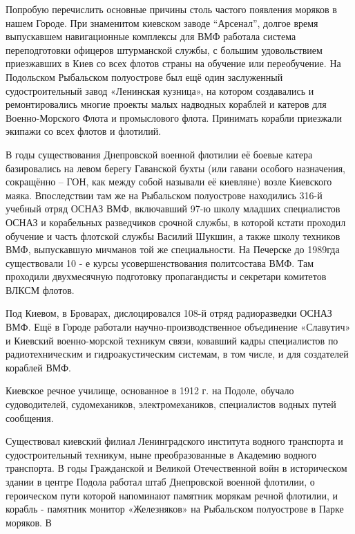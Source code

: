
Попробую перечислить основные причины столь частого появления
моряков в нашем Городе. При знаменитом киевском заводе \enquote{Арсенал}, долгое время
выпускавшем навигационные комплексы для ВМФ работала система переподготовки
офицеров штурманской службы, с большим удовольствием приезжавших в Киев со всех
флотов страны на обучение или переобучение. На Подольском Рыбальском
полуострове был ещё один заслуженный судостроительный завод «Ленинская
кузница», на котором создавались и ремонтировались многие проекты малых
надводных кораблей и катеров для Военно-Морского Флота и промыслового флота.
Принимать корабли приезжали экипажи со всех флотов и флотилий. 


В годы
существования Днепровской военной флотилии её боевые катера базировались на
левом берегу Гаванской бухты (или гавани особого назначения, сокращённо – ГОН,
как между собой называли её киевляне) возле Киевского маяка. Впоследствии там
же на Рыбальском полуострове находились 316-й учебный отряд ОСНАЗ ВМФ,
включавший 97-ю школу младших специалистов ОСНАЗ и корабельных разведчиков
срочной службы, в которой кстати проходил обучение и часть флотской службы
Василий Шукшин, а также школу техников ВМФ, выпускавшую мичманов той же
специальности. На Печерске до 1989гда существовали 10 - е курсы
усовершенствования политсостава ВМФ. Там проходили двухмесячную подготовку
пропагандисты и секретари комитетов ВЛКСМ флотов. 


Под Киевом, в Броварах,
дислоцировался 108-й отряд радиоразведки ОСНАЗ ВМФ. Ещё в Городе работали
научно-производственное объединение «Славутич» и Киевский военно-морской
техникум связи, ковавший кадры специалистов по радиотехническим и
гидроакустическим системам, в том числе, и для создателей кораблей ВМФ.


Киевское речное училище, основанное в 1912 г. на Подоле, обучало судоводителей,
судомехаников, электромехаников, специалистов водных путей сообщения.

Существовал киевский филиал Ленинградского института водного транспорта и
судостроительный техникум, ныне преобразованные в Академию водного транспорта.
В годы Гражданской и Великой Отечественной войн в историческом здании в центре
Подола работал штаб Днепровской военной флотилии, о героическом пути которой
напоминают памятник морякам речной флотилии, и корабль - памятник монитор
«Железняков» на Рыбальском полуострове в Парке моряков. В

